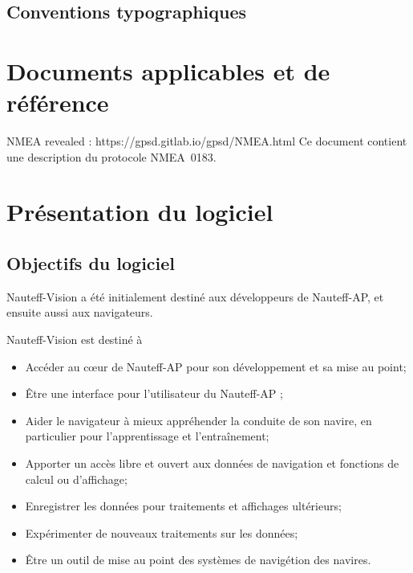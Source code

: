 \documentclass[a4paper,11pt]{report}
\begin{document}
\section{Conventions typographiques}

\chapter{Documents applicables et de référence}

NMEA revealed : https://gpsd.gitlab.io/gpsd/NMEA.html
Ce document contient une description du protocole NMEA~0183.


\printglossary[numberedsection, type=\acronymtype, title=Terminologie]

\chapter{Présentation du logiciel}
\label{presentation}
\section{Objectifs du logiciel}

Nauteff-Vision a été initialement destiné aux développeurs de Nauteff-AP,
et ensuite aussi aux navigateurs.

Nauteff-Vision est destiné à 
\begin{itemize}
	\item Accéder au cœur de Nauteff-AP pour son développement et sa mise au point;
	\item Être une interface pour l'utilisateur du Nauteff-AP ;
	\item Aider le navigateur à mieux appréhender la conduite de son navire, en particulier pour l'apprentissage et l'entraînement;
	\item Apporter un accès libre et ouvert aux données de navigation et fonctions de calcul ou d'affichage;
	\item Enregistrer les données pour traitements et affichages ultérieurs;
	\item Expérimenter de nouveaux traitements sur les données;
	\item Être un outil de mise au point des systèmes de navigétion des navires.
\end{itemize}
\end{document}
